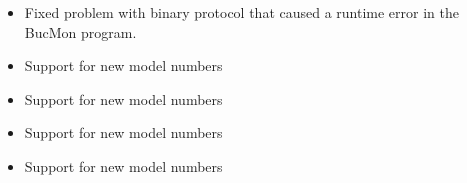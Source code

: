 \documentclass[letterpaper,10pt,english]{sphinxhowto}
\begin{document}
\begin{description}
\begin{itemize}
\item {} 
\sphinxAtStartPar
Fixed problem with binary protocol that caused a runtime error in the BucMon program.

\end{itemize}

\begin{itemize}
\item {} 
\sphinxAtStartPar
Support for new model numbers

\end{itemize}

\begin{itemize}
\item {} 
\sphinxAtStartPar
Support for new model numbers

\end{itemize}

\begin{itemize}
\item {} 
\sphinxAtStartPar
Support for new model numbers

\end{itemize}

\begin{itemize}
\item {} 
\sphinxAtStartPar
Support for new model numbers

\end{itemize}

\end{description}
\end{document}
